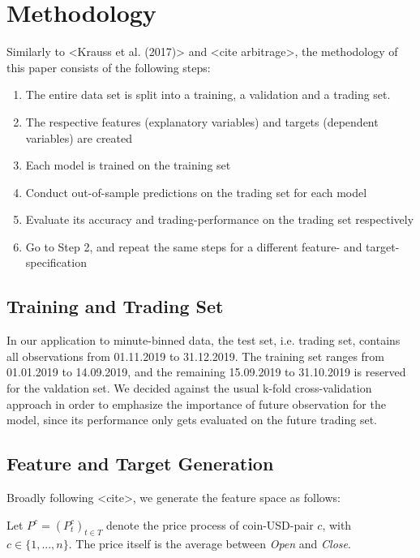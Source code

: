 \section{Methodology}
Similarly to <Krauss et al. (2017)> and <cite arbitrage>, the methodology of this paper consists of
the following steps:

\begin{enumerate}
    \item The entire data set is split into a training, a validation and a trading set.
    \item The respective features (explanatory variables) and targets (dependent variables) are created
    \item Each model is trained on the training set
    \item Conduct out-of-sample predictions on the trading set for each model 
    \item Evaluate its accuracy and trading-performance on the trading set respectively
    \item Go to Step 2, and repeat the same steps for a different feature- and target-specification
  \end{enumerate}


\subsection{Training and Trading Set} \label{ch:training_trading}
In our application to minute-binned data, the test set, i.e. trading set, contains all observations from 01.11.2019 to 31.12.2019.
The training set ranges from 01.01.2019 to 14.09.2019, and the remaining 15.09.2019 to 31.10.2019 
is reserved for the valdation set. We decided against the usual k-fold cross-validation approach 
in order to emphasize the importance of future observation for the model, since its performance only gets
evaluated on the future trading set.

\subsection{Feature and Target Generation}
Broadly following <cite>, we generate the feature space as follows:

Let $ P^{c} = ( P^{c}_{t} )_{t \in T} $ denote the price process of coin-USD-pair $ c $, with $ c \in \{1, ... , n\} $. The price itself is the average between \textit{Open} and \textit{Close}.

